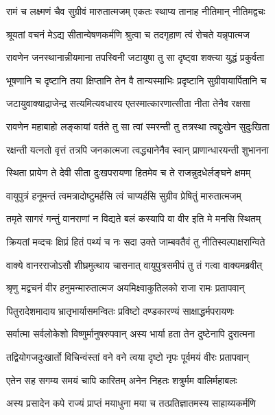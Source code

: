 \twolineshloka
{रामं च लक्ष्मणं चैव सुग्रीवं मारुतात्मजम्}
{एकतः स्थाप्य तानाह नीतिमान् नीतिमद्वचः} %

\twolineshloka
{श्रूयतां वचनं मेऽद्य सीतान्वेषणकर्मणि}
{श्रुत्वा च तदगृहाण त्वं रोचते यन्नृपात्मज} %

\twolineshloka
{रावणेन जनस्थानान्नीयमाना तपस्विनी}
{जटायुषा तु सा दृष्ट्वा शक्त्या युद्धं प्रकुर्वता} %

\twolineshloka
{भूषणानि च दृष्टानि तया क्षिप्तानि तेन वै}
{तान्यस्माभिः प्रदृष्टानि सुग्रीवायार्पितानि च} %

\twolineshloka
{जटायुवाक्याद्राजेन्द्र सत्यमित्यवधारय}
{एतस्मात्कारणात्सीता नीता तेनैव रक्षसा} %

\twolineshloka
{रावणेन महाबाहो लङ्कायां वर्तते तु सा}
{त्वां स्मरन्ती तु तत्रस्था त्वद्दुःखेन सुदुःखिता} %

\twolineshloka
{रक्षन्ती यत्नतो वृत्तं तत्रपि जनकात्मजा}
{त्वद्ध्यानेनैव स्वान् प्राणान्धारयन्ती शुभानना} %

\twolineshloka
{स्थिता प्रायेण ते देवी सीता दुःखपरायणा}
{हितमेव च ते राजन्नुदधेर्लङ्घने क्षमम्} %

\twolineshloka
{वायुपुत्रं हनूमन्तं त्वमत्रादोष्टुमर्हसि}
{त्वं चाप्यर्हसि सुग्रीव प्रेषितुं मारुतात्मजम्} %

\twolineshloka
{तमृते सागरं गन्तुं वानराणां न विद्यते}
{बलं कस्यापि वा वीर इति मे मनसि स्थितम्} %

\twolineshloka
{क्रियतां मव्दचः क्षिप्रं हितं पथ्यं च नः सदा}
{उक्ते जाम्बवतैवं तु नीतिस्वल्पाक्षरान्विते} %

\twolineshloka
{वाक्ये वानरराजोऽसौ शीघ्रमुत्थाय चासनात्}
{वायुपुत्रसमीपं तु तं गत्वा वाक्यमब्रवीत्} %

\twolineshloka
{श्रृणु मद्वचनं वीर हनुमन्मारुतात्मज}
{अयमिक्ष्वाकुतिलको राजा रामः प्रतापवान्} %

\twolineshloka
{पितुरादेशमादाय भ्रातृभार्यासमन्वितः}
{प्रविष्टो दण्डकारण्यं साक्षाद्धर्मपरायणः} %

\twolineshloka
{सर्वात्मा सर्वलोकेशो विष्णुर्मानुषरुपवान्}
{अस्य भार्या हता तेन दुष्टेनापि दुरात्मना} %

\twolineshloka
{तद्वियोगजदुःखार्तो विचिन्वंस्तां वने वने}
{त्वया दृष्टो नृपः पूर्वमयं वीरः प्रतापवान्} %

\twolineshloka
{एतेन सह सगम्य समयं चापि कारितम्}
{अनेन निहतः शत्रुर्मम वालिर्महाबलः} %

\twolineshloka
{अस्य प्रसादेन कपे राज्यं प्राप्तं मयाधुना}
{मया च तत्प्रतिज्ञातमस्य साहाय्यकर्मणि} %

